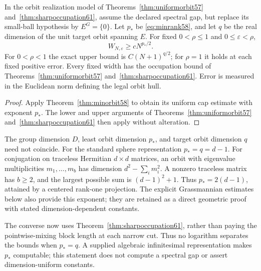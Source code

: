\begin{corollary}
\label{cor:allrepresentations58}
In the orbit realization model of Theorems~\ref{thm:uniformorbit57} and~\ref{thm:sharpoccupation61}, assume
the declared spectral gap, but replace its small-ball hypothesis by
$E^G=\{0\}$. Let $p_*$ be \eqref{eq:minrank58}, and let $q$ be the real
dimension of the unit target orbit spanning $E$. For fixed
$0<\rho\le1$ and $0\le\varepsilon<\rho$,
\[
 W_{N,\varepsilon}\ge cN^{p_*/2}.
\]
For $0<\rho<1$ the exact upper bound is $C(N+1)^{q/2}$; for $\rho=1$
it holds at each fixed positive error. Every fixed width has the
occupation bound of Theorems~\ref{thm:uniformorbit57} and~\ref{thm:sharpoccupation61}. Error is measured in
the Euclidean norm defining the legal orbit hull.
\end{corollary}
\begin{proof}
Apply Theorem~\ref{thm:minorbit58} to obtain its uniform cap estimate with
exponent $p_*$. The lower and upper arguments of
Theorems~\ref{thm:uniformorbit57} and~\ref{thm:sharpoccupation61} then apply without alteration.
\end{proof}
The group dimension $D$, least orbit dimension $p_*$, and target orbit
dimension $q$ need not coincide. For the standard sphere representation
$p_*=q=d-1$. For conjugation on traceless Hermitian $d\times d$ matrices,
an orbit with eigenvalue multiplicities $m_1,\ldots,m_b$ has dimension
$d^2-\sum_i m_i^2$. A nonzero traceless matrix has $b\ge2$, and the
largest possible sum is $(d-1)^2+1$. Thus $p_*=2(d-1)$, attained by a
centered rank-one projection. The explicit Grassmannian estimates below
also provide this exponent; they are retained as a direct geometric
proof with stated dimension-dependent constants.

The converse now uses Theorem~\ref{thm:sharpoccupation61}, rather than
paying the pointwise-mixing block length at each narrow cut. Thus no
logarithm separates the bounds when $p_*=q$. A supplied algebraic
infinitesimal representation makes $p_*$ computable; this statement
does not compute a spectral gap or assert dimension-uniform constants.
